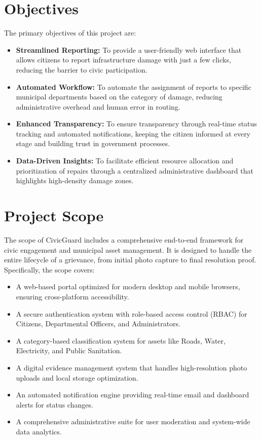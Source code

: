 \section{Objectives}
The primary objectives of this project are:
\begin{itemize}
    \item \textbf{Streamlined Reporting:} To provide a user-friendly web interface that allows citizens to report infrastructure damage with just a few clicks, reducing the barrier to civic participation.
    \item \textbf{Automated Workflow:} To automate the assignment of reports to specific municipal departments based on the category of damage, reducing administrative overhead and human error in routing.
    \item \textbf{Enhanced Transparency:} To ensure transparency through real-time status tracking and automated notifications, keeping the citizen informed at every stage and building trust in government processes.
    \item \textbf{Data-Driven Insights:} To facilitate efficient resource allocation and prioritization of repairs through a centralized administrative dashboard that highlights high-density damage zones.
\end{itemize}

\section{Project Scope}
The scope of CivicGuard includes a comprehensive end-to-end framework for civic engagement and municipal asset management. It is designed to handle the entire lifecycle of a grievance, from initial photo capture to final resolution proof. Specifically, the scope covers:
\begin{itemize}
    \item A web-based portal optimized for modern desktop and mobile browsers, ensuring cross-platform accessibility.
    \item A secure authentication system with role-based access control (RBAC) for Citizens, Departmental Officers, and Administrators.
    \item A category-based classification system for assets like Roads, Water, Electricity, and Public Sanitation.
    \item A digital evidence management system that handles high-resolution photo uploads and local storage optimization.
    \item An automated notification engine providing real-time email and dashboard alerts for status changes.
    \item A comprehensive administrative suite for user moderation and system-wide data analytics.
\end{itemize}

